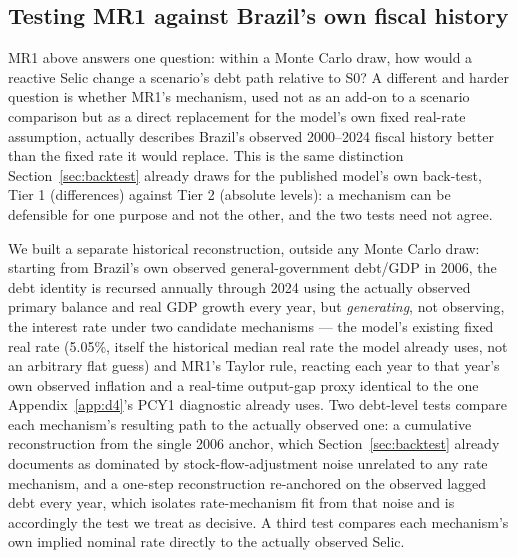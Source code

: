 \documentclass[11pt,a4paper]{article}
\begin{document}
\subsection{Testing MR1 against Brazil's own fiscal history}
\label{sec:mr1-historical}

MR1 above answers one question: within a Monte Carlo draw, how would a reactive Selic change a scenario's debt path relative to \textsc{S0}? A different and harder question is whether MR1's mechanism, used not as an add-on to a scenario comparison but as a direct replacement for the model's own fixed real-rate assumption, actually describes Brazil's observed 2000--2024 fiscal history better than the fixed rate it would replace. This is the same distinction Section~\ref{sec:backtest} already draws for the published model's own back-test, Tier 1 (differences) against Tier 2 (absolute levels): a mechanism can be defensible for one purpose and not the other, and the two tests need not agree.

We built a separate historical reconstruction, outside any Monte Carlo draw: starting from Brazil's own observed general-government debt/GDP in 2006, the debt identity is recursed annually through 2024 using the actually observed primary balance and real GDP growth every year, but \emph{generating}, not observing, the interest rate under two candidate mechanisms --- the model's existing fixed real rate (5.05\%, itself the historical median real rate the model already uses, not an arbitrary flat guess) and MR1's Taylor rule, reacting each year to that year's own observed inflation and a real-time output-gap proxy identical to the one Appendix~\ref{app:d4}'s PCY1 diagnostic already uses. Two debt-level tests compare each mechanism's resulting path to the actually observed one: a cumulative reconstruction from the single 2006 anchor, which Section~\ref{sec:backtest} already documents as dominated by stock-flow-adjustment noise unrelated to any rate mechanism, and a one-step reconstruction re-anchored on the observed lagged debt every year, which isolates rate-mechanism fit from that noise and is accordingly the test we treat as decisive. A third test compares each mechanism's own implied nominal rate directly to the actually observed Selic.
\end{document}
